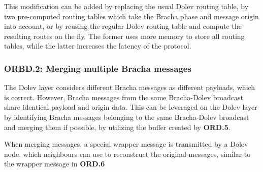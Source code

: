 This modification can be added by replacing the usual Dolev routing table, by two pre-computed routing tables which take the Bracha phase and message origin into account, or by reusing the regular Dolev routing table and compute the resulting routes on the fly. The former uses more memory to store all routing tables, while the latter increases the latency of the protocol.

\subsubsection{ORBD.2: Merging multiple Bracha messages}
The Dolev layer considers different Bracha messages as different payloads, which is correct. However, Bracha messages from the same Bracha-Dolev broadcast share identical payload and origin data. This can be leveraged on the Dolev layer by identifying Bracha messages belonging to the same Bracha-Dolev broadcast and merging them if possible, by utilizing the buffer created by \textbf{ORD.5}.

When merging messages, a special wrapper message is transmitted by a Dolev node, which neighbours can use to reconstruct the original messages, similar to the wrapper message in \textbf{ORD.6}